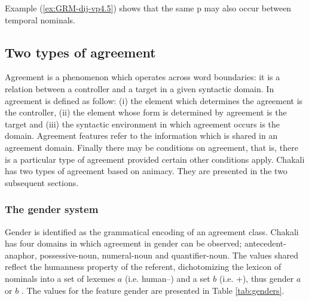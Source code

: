 \begin{exe}
\begin{exe}
\begin{exe}
\begin{exe}
\begin{exe}
\begin{exe}
\begin{exe}
\begin{exe}
\begin{exe}
\begin{exe}
\begin{exe}
Example (\ref{ex:GRM-dij-vp4.5}) shows that the same
p may also occur between
 temporal nominals. 





\subsection{Two types of agreement}
\label{sec:GRM-agrrement}

Agreement is a phenomenon which operates
across word boundaries: it is a relation between a controller and a
target in a given syntactic domain. In \citet{Corb06} 
  agreement is defined as follow: (i) the element which determines the
  agreement is the controller, (ii) the element whose form is determined by
  agreement is the target and (iii) the syntactic environment in which
  agreement occurs is the domain. Agreement features refer to the information
which is shared in an agreement domain. Finally there may be conditions on
  agreement, that  is, there is a particular type of agreement provided certain
  other conditions apply. Chakali has two types of agreement based on animacy.
They are presented in the two subsequent sections. 

\subsubsection{The gender system}
\label{sec:GRM-gender}


Gender is identified as the grammatical encoding of an agreement class.  Chakali has four domains in which agreement in gender can be observed; antecedent-anaphor,  possessive-noun, numeral-noun and  quantifier-noun. The values shared reflect the humanness property of the referent, dichotomizing the lexicon of nominals into a set of lexemes $a$ (i.e. human--) and a set $b$ (i.e.  +), thus {\sc gender} $a$ or $b$   \citep{brin08, brin08c}.  The values for the feature {\sc gender} are presented in Table \ref{tab:genders}. 


\begin{table}
  \centering
  \caption{Gender in Chakali}
\label{tab:genders}




\end{table}
\end{exe}
\end{exe}
\end{exe}
\end{exe}
\end{exe}
\end{exe}
\end{exe}
\end{exe}
\end{exe}
\end{exe}
\end{exe}
